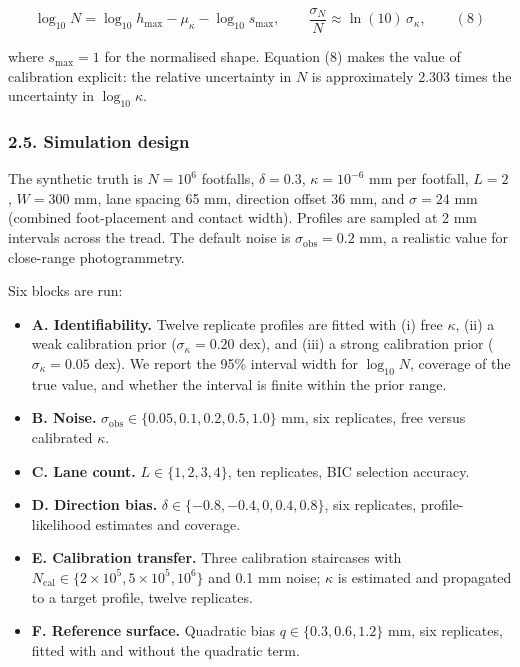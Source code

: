 \documentclass[
]{article}
\providecommand{\tightlist}{%
  \setlength{\itemsep}{0pt}\setlength{\parskip}{0pt}}
\begin{document}
\[
\log_{10}N=\log_{10}h_{\max}-\mu_\kappa-\log_{10}s_{\max},
\qquad
\frac{\sigma_N}{N}\approx\ln(10)\,\sigma_\kappa,
\qquad (8)
\]

where \(s_{\max}=1\) for the normalised shape. Equation (8) makes the
value of calibration explicit: the relative uncertainty in \(N\) is
approximately 2.303 times the uncertainty in \(\log_{10}\kappa\).

\subsubsection{2.5. Simulation design}\label{simulation-design}

The synthetic truth is \(N=10^6\) footfalls, \(\delta=0.3\),
\(\kappa=10^{-6}\) mm per footfall, \(L=2\), \(W=300\) mm, lane spacing
65 mm, direction offset 36 mm, and \(\sigma=24\) mm (combined
foot-placement and contact width). Profiles are sampled at 2 mm
intervals across the tread. The default noise is
\(\sigma_{\mathrm{obs}}=0.2\) mm, a realistic value for close-range
photogrammetry.

Six blocks are run:

\begin{itemize}
\tightlist
\item
  \textbf{A. Identifiability.} Twelve replicate profiles are fitted with
  (i) free \(\kappa\), (ii) a weak calibration prior
  (\(\sigma_\kappa=0.20\) dex), and (iii) a strong calibration prior
  (\(\sigma_\kappa=0.05\) dex). We report the 95\% interval width for
  \(\log_{10}N\), coverage of the true value, and whether the interval
  is finite within the prior range.
\item
  \textbf{B. Noise.}
  \(\sigma_{\mathrm{obs}}\in\{0.05,0.1,0.2,0.5,1.0\}\) mm, six
  replicates, free versus calibrated \(\kappa\).
\item
  \textbf{C. Lane count.} \(L\in\{1,2,3,4\}\), ten replicates, BIC
  selection accuracy.
\item
  \textbf{D. Direction bias.} \(\delta\in\{-0.8,-0.4,0,0.4,0.8\}\), six
  replicates, profile-likelihood estimates and coverage.
\item
  \textbf{E. Calibration transfer.} Three calibration staircases with
  \(N_{\mathrm{cal}}\in\{2\times10^5,5\times10^5,10^6\}\) and 0.1 mm
  noise; \(\kappa\) is estimated and propagated to a target profile,
  twelve replicates.
\item
  \textbf{F. Reference surface.} Quadratic bias \(q\in\{0.3,0.6,1.2\}\)
  mm, six replicates, fitted with and without the quadratic term.
\end{itemize}
\end{document}
